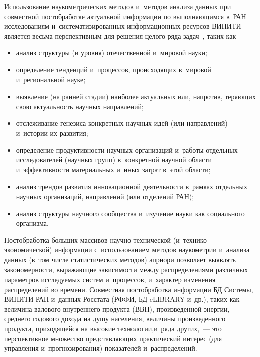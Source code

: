 \begin{multicols}{2}
    Использование наукометрических методов и~методов анализа данных при 
совместной пост\-об\-ра\-бот\-ке актуальной информации по вы\-пол\-ня\-ющим\-ся в~РАН 
исследованиям и~сис\-те\-ма\-ти\-зи\-ро\-ван\-ных информационных ресурсов ВИНИТИ 
является весьма перспективным для решения целого ряда задач~\cite{13-sun, 
14-sun}, таких как
    \begin{itemize}
    \item анализ структуры (и уровня) отечественной и~мировой науки;
    \item определение тенденций и~процессов, происходящих в~мировой 
и~региональной науке;
    \item выявление (на ранней стадии) наиболее актуальных или, 
напротив, теряющих свою актуальность научных на\-прав\-ле\-ний;
    \item отслеживание генезиса конкретных научных идей (или 
на\-прав\-ле\-ний) и~истории их развития;
    \item определение продуктивности научных организаций и~работы 
отдельных исследователей (научных групп) в~конкретной научной об\-ласти 
и~эффективности материальных и~иных затрат в~этой об\-ласти;
    \item анализ трендов развития инновационной деятельности в~рамках 
отдельных научных организаций, на\-прав\-ле\-ний (или отделений РАН);
    \item анализ структуры научного сообщества и~изуче\-ние науки как 
социального организма.
    \end{itemize}
    
    Постобработка больших массивов на\-уч\-но-тех\-ни\-че\-ской  
(и~тех\-ни\-ко-эко\-но\-ми\-че\-ской) информации с~использованием методов 
наукометрии и~анализа данных (в~том чис\-ле статистических методов) 
\mbox{априори} позволяет выявлять закономерности, выражающие зависимости между 
распределениями различных па\-ра\-мет\-ров исследуемых сис\-тем и~процессов, 
и~характер изменения распределений во времени. Совместная постобработка 
информации БД Сис\-те\-мы, ВИНИТИ РАН и~данных Росстата\linebreak
 (РФФИ, 
БД eLIBRARY и~др.), таких как величина валового внут\-рен\-не\-го продукта
(ВВП), про\-из\-веденной энергии, 
среднего годового дохода\linebreak
 на душу населения, величины произведенного 
продукта, приходящейся на высокие технологии,\linebreak и~ряда других,~--- это 
перспективное множество пред\-став\-ля\-ющих практический интерес (для 
управ\-ле\-ния и~прогнозирования) показателей и~распределений. 
    

\end{multicols}
